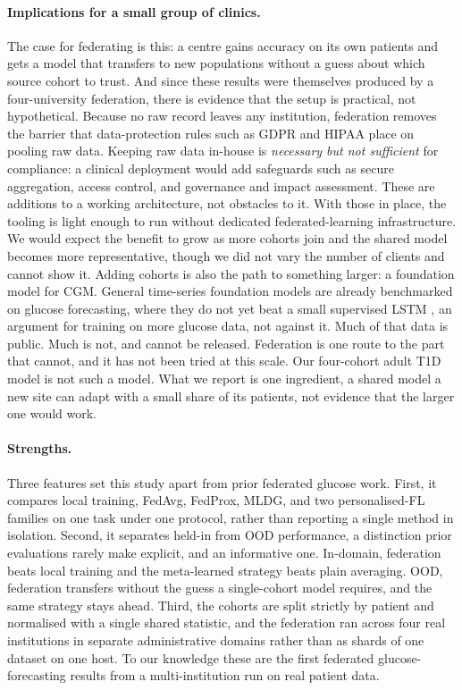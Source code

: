 \documentclass[10pt,letterpaper]{article}
\begin{document}
\paragraph{Implications for a small group of clinics.} The case for
federating is this: a centre gains accuracy on its own patients and gets a
model that transfers to new populations without a guess about which source
cohort to trust. And since these results were themselves produced by a
four-university federation, there is evidence that the setup is practical,
not hypothetical. Because no raw record leaves any institution, federation
removes the barrier that data-protection rules such as GDPR and HIPAA place
on pooling raw data. Keeping raw data in-house is \emph{necessary but not
sufficient} for compliance: a clinical deployment would add safeguards such as
secure aggregation, access control, and governance and impact assessment.
These are additions to a working architecture, not obstacles to it. With those in
place, the tooling is light enough to run without dedicated
federated-learning infrastructure. We
would expect the benefit to grow as more cohorts join and the shared model
becomes more representative, though we did not vary the number of clients and
cannot show it. Adding cohorts is also the path to something larger: a
foundation model for CGM. General time-series foundation models are already
benchmarked on glucose forecasting, where they do not yet beat a small
supervised LSTM \cite{lu2026glucofmbench}, an argument for training on
more glucose data, not against it. Much of that data is public. Much is not,
and cannot be released. Federation is one route to the part that cannot, and
it has not been tried at this scale. Our four-cohort adult T1D model is not
such a model. What we report is one ingredient, a shared model a new site
can adapt with a small share of its patients, not evidence that the larger
one would work.

\paragraph{Strengths.} Three features set this study apart from prior
federated glucose work. First, it compares local training, FedAvg, FedProx,
MLDG, and two personalised-FL families on one task under one protocol, rather
than reporting a single method in isolation. Second, it separates held-in
from OOD performance, a distinction prior evaluations rarely make
explicit, and an informative one. In-domain, federation beats local training
and the meta-learned strategy beats plain averaging. OOD, federation transfers
without the guess a single-cohort model requires, and the same strategy stays
ahead. Third, the cohorts are split strictly by patient and normalised
with a single shared statistic, and the federation ran across four real
institutions in separate administrative domains rather than as shards of one
dataset on one host. To our knowledge these are the first federated
glucose-forecasting results from a multi-institution run on real patient data.
\end{document}
